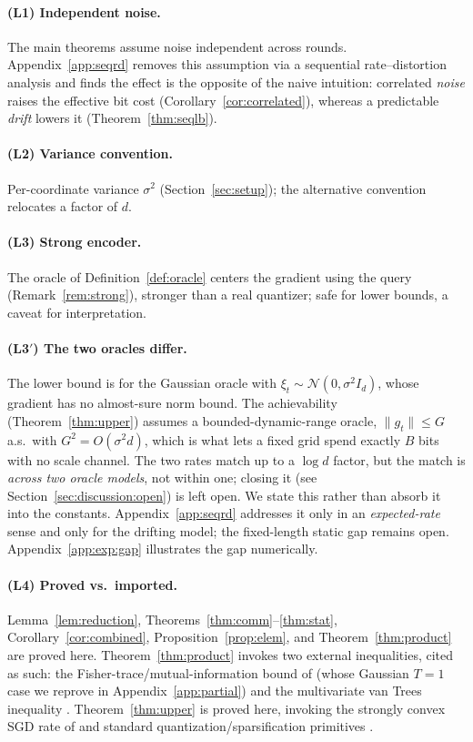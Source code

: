 \documentclass[11pt]{article}
\theoremstyle{definition}
\newcommand{\Ncal}{\mathcal{N}}
\begin{document}
\paragraph{(L1) Independent noise.} The main theorems assume noise independent across rounds.
Appendix~\ref{app:seqrd} removes this assumption via a sequential rate--distortion analysis and finds the
effect is the opposite of the naive intuition: correlated \emph{noise} raises the effective bit cost
(Corollary~\ref{cor:correlated}), whereas a predictable \emph{drift} lowers it
(Theorem~\ref{thm:seqlb}).
\paragraph{(L2) Variance convention.} Per-coordinate variance $\sigma^2$ (Section~\ref{sec:setup});
the alternative convention relocates a factor of $d$.
\paragraph{(L3) Strong encoder.} The oracle of Definition~\ref{def:oracle} centers the gradient
using the query (Remark~\ref{rem:strong}), stronger than a real quantizer; safe for lower bounds,
a caveat for interpretation.
\paragraph{(L3$'$) The two oracles differ.} The lower bound is for the Gaussian oracle with
$\xi_t\sim\Ncal(0,\sigma^2 I_d)$, whose gradient has no almost-sure norm bound. The achievability
(Theorem~\ref{thm:upper}) assumes a bounded-dynamic-range oracle, $\|g_t\|\le G$ a.s.\ with
$G^2=O(\sigma^2 d)$, which is what lets a fixed grid spend exactly $B$ bits with no scale channel.
The two rates match up to a $\log d$ factor, but the match is \emph{across two oracle models}, not
within one; closing it (see Section~\ref{sec:discussion:open}) is left open. We state this rather
than absorb it into the constants. Appendix~\ref{app:seqrd} addresses it only in an \emph{expected-rate}
sense and only for the drifting model; the fixed-length static gap remains open.
Appendix~\ref{app:exp:gap} illustrates the gap numerically.
\paragraph{(L4) Proved vs.\ imported.} Lemma~\ref{lem:reduction},
Theorems~\ref{thm:comm}--\ref{thm:stat}, Corollary~\ref{cor:combined},
Proposition~\ref{prop:elem}, and Theorem~\ref{thm:product} are proved here.
Theorem~\ref{thm:product} invokes two external inequalities, cited as such: the
Fisher-trace/mutual-information bound of \citet{barnes2021fisher} (whose Gaussian $T=1$ case we
reprove in Appendix~\ref{app:partial}) and the multivariate van Trees inequality
\citep{gilllevit1995}. Theorem~\ref{thm:upper} is proved here, invoking the strongly convex SGD
rate of \citet{bottou2018optimization} and standard quantization/sparsification primitives
\citep{alistarh2017qsgd,suresh2017dme,wangni2018gradient,stich2018sparsified,rakhlin2012making}.
\end{document}
